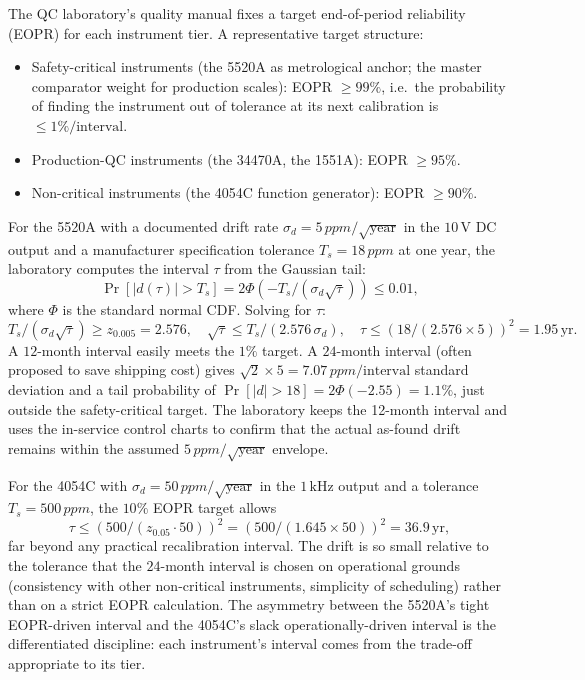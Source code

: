 The QC laboratory's quality manual fixes a target end-of-period
reliability (EOPR) for each instrument tier. A representative
target structure:
\begin{itemize}[leftmargin=*]
  \item Safety-critical instruments (the 5520A as metrological
    anchor; the master comparator weight for production scales):
    EOPR $\geq 99\%$, i.e.\ the probability of finding the
    instrument out of tolerance at its next calibration is
    $\leq 1\%/\text{interval}$.
  \item Production-QC instruments (the 34470A, the 1551A): EOPR
    $\geq 95\%$.
  \item Non-critical instruments (the 4054C function generator):
    EOPR $\geq 90\%$.
\end{itemize}
For the 5520A with a documented drift rate
$\sigma_{d} = 5\,\si{ppm}/\sqrt{\text{year}}$ in the $10\,\si{
\volt}$ DC output and a manufacturer specification tolerance
$T_{s} = 18\,\si{ppm}$ at one year, the laboratory computes the
interval $\tau$ from the Gaussian tail:
\[
\Pr[|d(\tau)| > T_{s}] = 2 \Phi(-T_{s}/(\sigma_{d}\sqrt{\tau}))
\leq 0.01,
\]
where $\Phi$ is the standard normal CDF. Solving for $\tau$:
\[
T_{s}/(\sigma_{d}\sqrt{\tau}) \geq z_{0.005} = 2.576,
\quad \sqrt{\tau} \leq T_{s}/(2.576\,\sigma_{d}),
\quad \tau \leq (18/(2.576 \times 5))^{2} = 1.95\,\text{yr}.
\]
A $12$-month interval easily meets the $1\%$ target. A
$24$-month interval (often proposed to save shipping cost) gives
$\sqrt{2} \times 5 = 7.07\,\si{ppm}/\text{interval}$ standard
deviation and a tail probability of $\Pr[|d| > 18] = 2\Phi(-2.55)
= 1.1\%$, just outside the safety-critical target. The laboratory
keeps the 12-month interval and uses the in-service control
charts to confirm that the actual as-found drift remains within
the assumed $5\,\si{ppm}/\sqrt{\text{year}}$ envelope.

For the 4054C with $\sigma_{d} = 50\,\si{ppm}/\sqrt{\text{year}}$
in the $1\,\si{\kilo\hertz}$ output and a tolerance $T_{s} =
500\,\si{ppm}$, the $10\%$ EOPR target allows
\[
\tau \leq (500/(z_{0.05} \cdot 50))^{2} = (500/(1.645 \times 50))^{2}
= 36.9\,\text{yr},
\]
far beyond any practical recalibration interval. The drift is so
small relative to the tolerance that the $24$-month interval is
chosen on operational grounds (consistency with other
non-critical instruments, simplicity of scheduling) rather than
on a strict EOPR calculation. The asymmetry between the 5520A's
tight EOPR-driven interval and the 4054C's slack
operationally-driven interval is the differentiated discipline:
each instrument's interval comes from the trade-off appropriate
to its tier.

